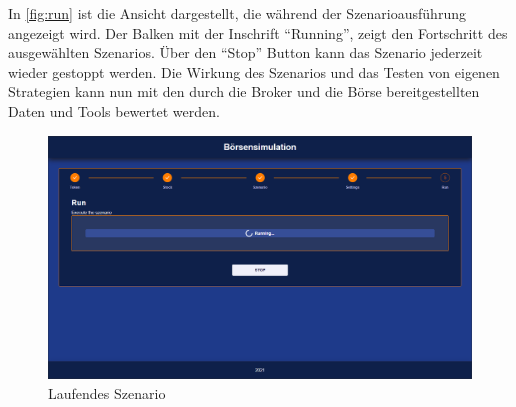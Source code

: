 In \autoref{fig:run} ist die Ansicht dargestellt, die während der Szenarioausführung angezeigt wird. Der Balken mit der Inschrift \enquote{Running}, zeigt den Fortschritt des ausgewählten Szenarios. Über den \enquote{Stop} Button kann das Szenario jederzeit wieder gestoppt werden. Die Wirkung des Szenarios und das Testen von eigenen Strategien kann nun mit den durch die Broker und die Börse bereitgestellten Daten und Tools bewertet werden. 
\begin{figure}[ht]
	\includegraphics[width=\textwidth]{img/Run.png}
	\centering
	\caption{Laufendes Szenario}
	\label{fig:run}
\end{figure}